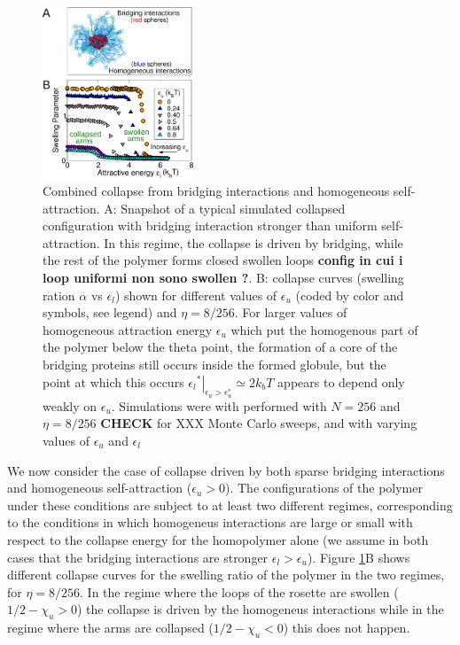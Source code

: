 \documentclass[
preprint,
a4paper,
12pt,
superscriptaddress,
pre]{revtex4}
\begin{document}
\begin{figure}
  \centering
  \includegraphics[width=0.4\textwidth]{fig4}
  \caption{Combined collapse from bridging interactions and
      homogeneous self-attraction.  A: Snapshot of a typical simulated
      collapsed configuration with bridging interaction stronger than
      uniform self-attraction. In this regime, the collapse is driven
      by bridging, 
      while the rest of the polymer forms closed swollen loops
      \textbf{config in cui i loop uniformi non sono swollen ?}.
    B: collapse curves (swelling ration $\alpha$ vs $\epsilon_l$) shown for
    different values of $\epsilon_u$ (coded by color and symbols, see
    legend) and $\eta = 8/256$.
%
    For larger values of homogeneous attraction energy $\epsilon_u$
    which put the homogenous part of the polymer below the theta
    point, the formation of a core  of the bridging proteins still occurs inside
    the formed globule, but the point at which this  occurs
    $\left.{\epsilon_l}^*\right|_{\epsilon_u > \epsilon_u^*} \simeq 2k_bT$
    appears to depend only weakly on $\epsilon_u$.
%
    Simulations were with performed with $N=256$ and $\eta=8/256$
    \textbf{CHECK} for XXX Monte Carlo sweeps, and with varying values
    of $\epsilon_u$ and $\epsilon_l$ }
  \label{fig:4}
\end{figure}

We now consider the case of collapse driven by both sparse bridging
interactions and homogeneous self-attraction ($\epsilon_u > 0$).  The
configurations of the polymer under these conditions are subject to at
least two different regimes, corresponding to the conditions in which
homogeneus interactions are large or small with respect to the
collapse energy for the homopolymer alone (we assume in both cases
that the bridging interactions are stronger $\epsilon_l >
\epsilon_u$).
Figure \ref{fig:4}B shows different collapse curves for the swelling
ratio of the polymer in the two regimes, for $\eta = 8/256$. In the
regime where the loops of the rosette are swollen ($1/2 - \chi_u > 0$)
the collapse is driven by the homogeneus interactions while in the
regime where the arms are collapsed ($1/2 - \chi_u < 0$) this does not
happen. 
%
\end{document}
